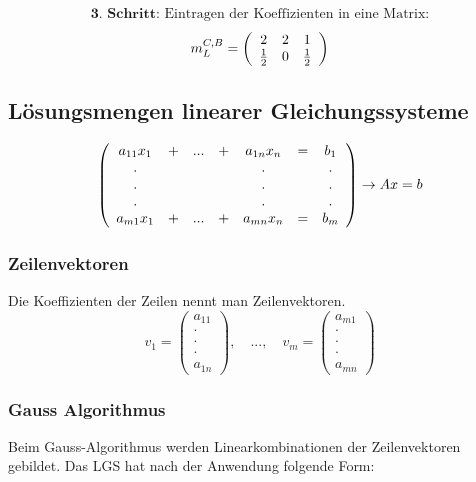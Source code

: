 \documentclass[12pt,a4paper]{article}%
\numberwithin{equation}{section}
\def\vecT#1{\left(\begin{array}{c} #1 \end{array}\right)}
\def\dddot{\cdot \\ \cdot \\ \cdot}
\def\vecDt#1#2{\vecT{#1 \\ \dddot \\ #2}}
\numberwithin{equation}{subsection}
\begin{document}
	    \begin{align*}
		     &\textbf{3. Schritt: } \text{Eintragen der Koeffizienten in eine Matrix:}& \nonumber 
		  \end{align*}
      \begin{align}
        m_L^{C,B} = \left(\begin{array}{c c c} 2 & 2 & 1 \\ \frac{1}{2} & 0 & \frac{1}{2} \end{array}\right)
      \end{align}        		   
		   
	    \subsection{Lösungsmengen linearer Gleichungssysteme}
	    \begin{align}
		    \left(
	      \begin{array}{c c c c c c c}
	      a_{11}x_1 & + &  ...   & + & a_{1n}x_n & =  & b_1\\
	      .         & \;& \;     & \;& .         & \; & . \\
	      .         & \;& \;     & \;& .         & \; & . \\
	      .         & \;& \;     & \;& .         & \; & . \\
	      a_{m1}x_1 & + & ...    & + & a_{mn}x_n & =  & b_m\\
	      \end{array}
	    \right) \rightarrow Ax = b   
	   \end{align} 
	   
	   \subsubsection{Zeilenvektoren}
	   Die Koeffizienten der Zeilen nennt man Zeilenvektoren.
	   \begin{equation}
	     v_1 = \vecDt{a_{11}}{a_{1n}}, \quad ..., \quad v_m = \vecDt{a_{m1}}{a_{mn}}
	   \end{equation}
	   
	   \subsubsection{Gauss Algorithmus}
	   Beim Gauss-Algorithmus werden Linearkombinationen der Zeilenvektoren gebildet. Das LGS hat nach der Anwendung folgende Form:
	   
\end{document}
